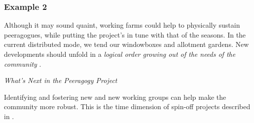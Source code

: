 \subsubsection*{Example 2} Although it may sound quaint, working farms could help to physically
sustain peeragogues, while putting the project's  in tune with that of the seasons.  In the
current distributed mode, we tend our windowboxes and allotment gardens.   New developments
should unfold in a \emph{logical order growing out of the needs of the community} \cite[Chapter IX]{washington1986up}.

\begin{framed}
\noindent 
\emph{What's Next in the Peeragogy Project}
\begin{collectinmacro}{\HeartbeatWN}{}{}
Identifying and fostering new  and new working groups can help make the community more robust.  This is the time dimension of spin-off projects described in .
\end{collectinmacro}
\HeartbeatWN
\end{framed}

